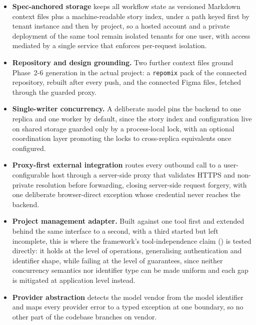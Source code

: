 \documentclass[sigconf,review=false]{acmart}
\begin{document}
\begin{itemize}[leftmargin=0.5cm,itemsep=0.3em]
\item \textbf{Spec-anchored storage} keeps all workflow state as versioned Markdown context files plus a machine-readable story index, under a path keyed first by tenant instance and then by project, so a hosted account and a private deployment of the same tool remain isolated tenants for one user, with access mediated by a single service that enforces per-request isolation.
\item \textbf{Repository and design grounding.} Two further context files ground Phase~2-6 generation in the actual project: a \texttt{repomix} pack of the connected repository, rebuilt after every push, and the connected Figma files, fetched through the guarded proxy.
\item \textbf{Single-writer concurrency.} A deliberate model pins the backend to one replica and one worker by default, since the story index and configuration live on shared storage guarded only by a process-local lock, with an optional coordination layer promoting the locks to cross-replica equivalents once configured.
\item \textbf{Proxy-first external integration} routes every outbound call to a user-configurable host through a server-side proxy that validates HTTPS and non-private resolution before forwarding, closing server-side request forgery, with one deliberate browser-direct exception whose credential never reaches the backend.
\item \textbf{Project management adapter.} Built against one tool first and extended behind the same interface to a second, with a third started but left incomplete, this is where the framework's tool-independence claim () is tested directly: it holds at the level of operations, generalising authentication and identifier shape, while failing at the level of guarantees, since neither concurrency semantics nor identifier type can be made uniform and each gap is mitigated at application level instead.
\item \textbf{Provider abstraction} detects the model vendor from the model identifier and maps every provider error to a typed exception at one boundary, so no other part of the codebase branches on vendor.
\end{itemize}
\end{document}
